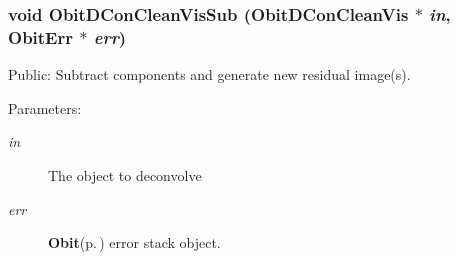 \subsubsection{\setlength{\rightskip}{0pt plus 5cm}void Obit\-DCon\-Clean\-Vis\-Sub ({\bf Obit\-DCon\-Clean\-Vis} $\ast$ {\em in}, {\bf Obit\-Err} $\ast$ {\em err})}\label{ObitDConCleanVis_8c_a21}


Public: Subtract components and generate new residual image(s). 

\begin{Desc}
\item[Parameters:]
\begin{description}
\item[{\em in}]The object to deconvolve \item[{\em err}]{\bf Obit}{\rm (p.\,\pageref{structObit})} error stack object. \end{description}
\end{Desc}
